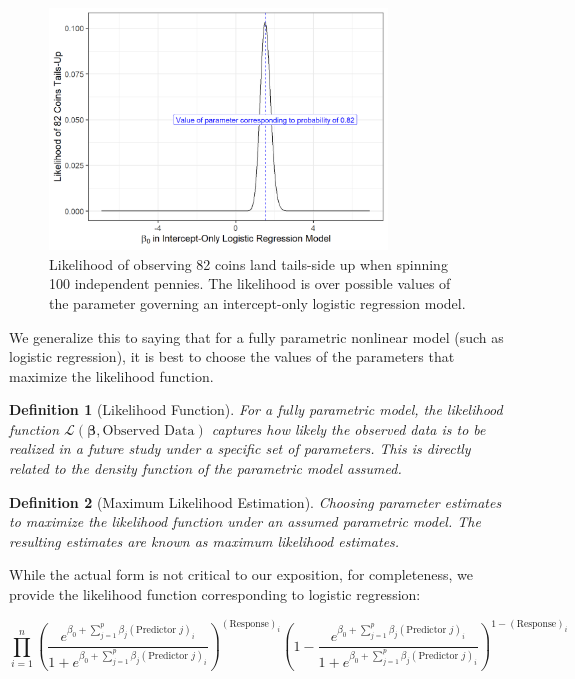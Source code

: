 \documentclass[
]{book}
\theoremstyle{plain}
\theoremstyle{mydefn}
\newtheorem{definition}{Definition}[chapter]
\theoremstyle{myexmpl}
\theoremstyle{remark}
\begin{document}
\begin{figure}

{\centering \includegraphics[width=0.8\textwidth]{./Images/nlm-coins-likelihood-1} 

}

\caption{Likelihood of observing 82 coins land tails-side up when spinning 100 independent pennies. The likelihood is over possible values of the parameter governing an intercept-only logistic regression model.}\label{fig:nlm-coins-likelihood}
\end{figure}

We generalize this to saying that for a fully parametric nonlinear model (such as logistic regression), it is best to choose the values of the parameters that maximize the likelihood function.

\begin{definition}[Likelihood Function]
For a fully parametric model, the likelihood function \(\mathcal{L}(\boldsymbol{\beta}, \text{Observed Data})\) captures how likely the observed data is to be realized in a future study under a specific set of parameters. This is directly related to the density function of the parametric model assumed.
\end{definition}

\begin{definition}[Maximum Likelihood Estimation]
Choosing parameter estimates to maximize the likelihood function under an assumed parametric model. The resulting estimates are known as maximum likelihood estimates.
\end{definition}

While the actual form is not critical to our exposition, for completeness, we provide the likelihood function corresponding to logistic regression:

\[\prod_{i=1}^{n} \left(\frac{e^{\beta_0 + \sum_{j=1}^{p} \beta_j (\text{Predictor } j)_i}}{1 + e^{\beta_0 + \sum_{j=1}^{p} \beta_j (\text{Predictor } j)_i}}\right)^{(\text{Response})_i}\left(1 - \frac{e^{\beta_0 + \sum_{j=1}^{p} \beta_j (\text{Predictor } j)_i}}{1 + e^{\beta_0 + \sum_{j=1}^{p} \beta_j (\text{Predictor } j)_i}}\right)^{1 - (\text{Response})_i}\]
\end{document}
